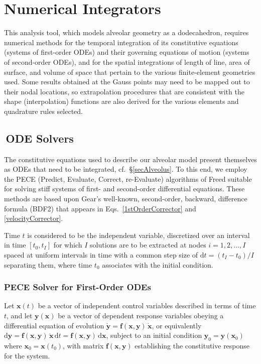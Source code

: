 \section{Numerical Integrators}
\label{partNumericalMethods}

This analysis tool, which models alveolar geometry as a dodecahedron, requires numerical methods for the temporal integration of its constitutive equations (systems of first-order ODEs) and their governing equations of motion (systems of second-order ODEs), and for the spatial integrations of length of line, area of surface, and volume of space that pertain to the various finite-element geometries used.  Some results obtained at the Gauss points may need to be mapped out to their nodal locations, so extrapolation procedures that are consistent with the shape (interpolation) functions are also derived for the various elements and quadrature rules selected.

\subsection{$\,$ODE Solvers}

The constitutive equations used to describe our alveolar model present themselves as ODEs that need to be integrated, cf.\ \S\ref{secAlveolus}.  To this end, we employ the PECE (Predict, Evaluate, Correct, re-Evaluate) algorithms of Freed \cite{Freed17a} suitable for solving stiff systems of first- and second-order differential equations.  These methods are based upon Gear's well-known, second-order, backward, difference formula (BDF2) that appears in Eqs.~\ref{1stOrderCorrector} and \ref{velocityCorrector}.

Time $t$ is considered to be the independent variable, discretized over an interval in time $[t_0, t_I]$ for which $I$ solutions are to be extracted at nodes $i=1, 2, \ldots, I$ spaced at uniform intervals in time with a common step size of $\mathrm{d}t = (t_I - t_0)/I$ separating them, where time $t_0$ associates with the initial condition.

\subsubsection{PECE Solver for First-Order ODEs}
\label{sec:1stOrderPECE}

Let $\mathbf{x}(t)$ be a vector of independent control variables described in terms of time $t$, and let $\mathbf{y} (\mathbf{x})$ be a vector of dependent response variables obeying a differential equation of evolution $\dot{\mathbf{y}} = \mathbf{f} (\mathbf{x}, \mathbf{y}) \, \dot{\mathbf{x}}$, or equivalently $\mathrm{d} \mathbf{y} = \mathbf{f} (\mathbf{x}, \mathbf{y}) \, \dot{\mathbf{x}} \, \mathrm{d} t = \mathbf{f} (\mathbf{x}, \mathbf{y}) \, \mathrm{d}\mathbf{x}$, subject to an initial condition $\mathbf{y}_0 = \mathbf{y}(\mathbf{x}_0)$ where $\mathbf{x}_0 = \mathbf{x} (t_0)$, with matrix $\mathbf{f} (\mathbf{x}, \mathbf{y})$ establishing the constitutive response for the system.

